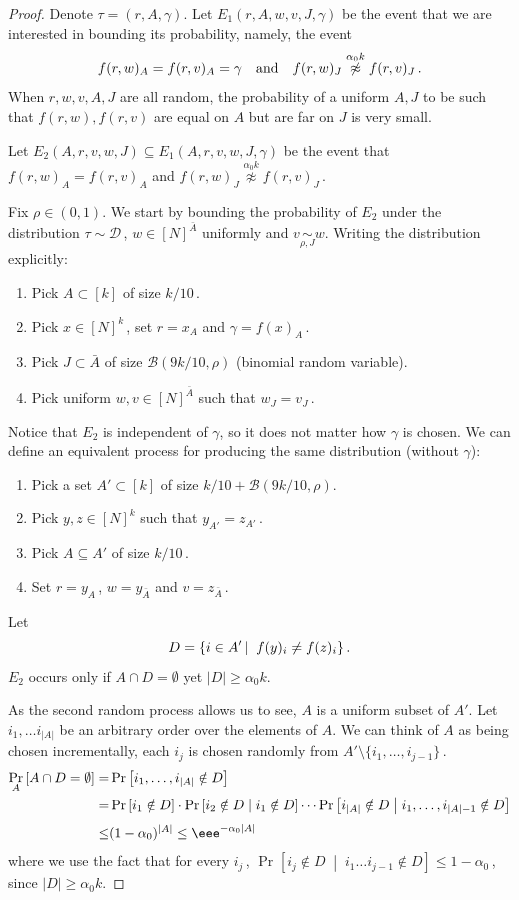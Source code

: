 \documentclass{toc}
\newcommand{\Prob}[2][]{\Pr_{{#1}}\left[#2\right]} %
\newcommand{\abs}[1]{\lvert#1\rvert} %
\newcommand{\given}{\;\middle\vert\;} %
\newcommand\sett[2]{\left\{ #1 \left| \; \vphantom{#1 #2} \right. #2  \right\}} %
\newcommand\f{f} %
\newcommand\neqg[1]{\stackrel{{#1}}{ \not\approx}} %
\newcommand\cor[1]{\underset{\scriptscriptstyle#1}{\sim}} %
\newcommand\rest[1]{{\bar{#1}}}  %
\begin{document}
\begin{proof}
    Denote $\tau = (r,A,\gamma)$. Let $E_1(r,A,w,v,J,\gamma)$ be the event 
	that we are interested in bounding its probability, %
namely, the event 
    \[\f(r,w)_A = \f(r,v)_A=\gamma\quad\hbox{and}\quad \f(r,w)_J\neqg{\alpha_0 k}\f(r,v)_J\,.\] %
    When $r,w,v,A,J$ are all random, the probability of a uniform $A,J$ to be such that $\f(r,w),\f(r,v)$ are equal on $A$ but are far on $J$ is very small.
    
	Let $E_2(A,r,v,w,J) \subseteq E_1(A,r,v,w,J,\gamma)$ be the event that $\f(r,w)_A = \f(r,v)_A$ and $\f(r,w)_{ J}\neqg{\alpha_0 k}\f(r,v)_{J}$\,. 
	
Fix $\rho\in(0,1)$. 
	We start by bounding the probability of $E_2$ under the distribution $\tau\sim\mathcal{D}$\,, $w\in[N]^{\bar{A}}$ uniformly and $v\cor{\rho,J}{w}$.
	Writing the distribution explicitly:
	\begin{enumerate}
		\item Pick $A\subset[k]$ of size $k/10$\,.
		\item Pick $x\in[N]^k$\,, set $r = x_A$ and $\gamma = f(x)_A$\,.
		\item Pick $J\subset\bar{A}$ of size $\mathcal{B}(9k/10,\rho)$ (binomial random variable).
		\item Pick uniform $w,v\in[N]^{\bar{A}}$ such that $w_J= v_J$\,.
	\end{enumerate}
	Notice that $E_2$ is independent of $\gamma$, so it does not matter how $\gamma$ is chosen. We can define an equivalent process for producing the same distribution (without $\gamma$):
	\begin{enumerate}
		\item Pick a set $A'\subset[k]$ of size $k/10+\mathcal{B}(9k/10,\rho)$.
		\item Pick $y,z\in[N]^k$ such that $y_{A'} = z_{A'}$\,.
		\item Pick $A\subseteq A'$ of size $k/10$\,.
		\item Set $r=y_A$\,, $w=y_\rest{A}$ and $v=z_{\rest{A}}$\,.
	\end{enumerate}
	
	 Let
	\[ D = \sett{i\in A'}{\f(y)_{i}\neq\f(z)_{i}}. \]
	$E_2$ occurs only if $A\cap D=\emptyset$ yet $|D| \ge \alpha_0 k$.
	
	As the second random process allows us to see, $A$ is a uniform  subset of $A'$.
    Let $i_1,\dots i_{\abs{A}}$ be an arbitrary order over the elements of $A$. We can think of $A$ as being chosen incrementally, each $i_j$ is chosen randomly from $A'\setminus\{i_1,\ldots, i_{j-1}\}$\,.
	\begin{align}\label{eq:no intersection}
	\Prob[A]{A\cap D = \emptyset}=&\Prob{i_1,\ldots,i_{\abs{A}}\notin D}\\
	=&\Prob{i_1\notin D}\cdot \Prob{i_2\notin D\given i_1\notin D}\cdots \Prob{i_{\abs{A}}\notin D \given i_1,\ldots ,i_{\abs{A}-1}\notin D}\nonumber\\
\leq& (1-\alpha_0)^{\abs{A}}\leq \eee^{-\alpha_0 \abs{A}}\, %
\nonumber
	\end{align}
%
where  %
we use the fact that for every $i_j$\,, $\Prob{i_{j}\notin D \given i_1\ldots i_{j-1}\notin D}\leq 1-\alpha_0$\,, since $\abs{D}\geq\alpha_0 k$.
	

\end{proof}
\end{document}
